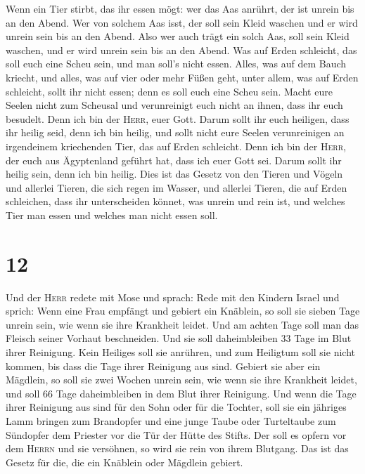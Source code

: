  Wenn ein Tier stirbt, das ihr essen mögt: wer das Aas
anrührt, der ist unrein bis an den Abend.  Wer von
solchem Aas isst, der soll sein Kleid waschen und er wird unrein sein
bis an den Abend. Also wer auch trägt ein solch Aas, soll sein Kleid
waschen, und er wird unrein sein bis an den Abend.  Was
auf Erden schleicht, das soll euch eine Scheu sein, und man soll's nicht
essen.  Alles, was auf dem Bauch kriecht, und alles, was
auf vier oder mehr Füßen geht, unter allem, was auf Erden schleicht,
sollt ihr nicht essen; denn es soll euch eine Scheu sein.
 Macht eure Seelen nicht zum Scheusal und verunreinigt
euch nicht an ihnen, dass ihr euch besudelt.  Denn ich
bin der \textsc{Herr}, euer Gott. Darum sollt ihr euch heiligen, dass
ihr heilig seid, denn ich bin heilig, und sollt nicht eure Seelen
verunreinigen an irgendeinem kriechenden Tier, das auf Erden schleicht.
 Denn ich bin der \textsc{Herr}, der euch aus Ägyptenland
geführt hat, dass ich euer Gott sei. Darum sollt ihr heilig sein, denn
ich bin heilig.  Dies ist das Gesetz von den Tieren und
Vögeln und allerlei Tieren, die sich regen im Wasser, und allerlei
Tieren, die auf Erden schleichen,  dass ihr unterscheiden
könnet, was unrein und rein ist, und welches Tier man essen und welches
man nicht essen soll.

\hypertarget{section-11}{%
\section{12}\label{section-11}}

 Und der \textsc{Herr} redete mit Mose und sprach:
 Rede mit den Kindern Israel und sprich: Wenn eine Frau
empfängt und gebiert ein Knäblein, so soll sie sieben Tage unrein sein,
wie wenn sie ihre Krankheit leidet.  Und am achten Tage
soll man das Fleisch seiner Vorhaut beschneiden.  Und sie
soll daheimbleiben 33 Tage im Blut ihrer Reinigung. Kein Heiliges soll
sie anrühren, und zum Heiligtum soll sie nicht kommen, bis dass die Tage
ihrer Reinigung aus sind.  Gebiert sie aber ein Mägdlein,
so soll sie zwei Wochen unrein sein, wie wenn sie ihre Krankheit leidet,
und soll 66 Tage daheimbleiben in dem Blut ihrer Reinigung.
 Und wenn die Tage ihrer Reinigung aus sind für den Sohn
oder für die Tochter, soll sie ein jähriges Lamm bringen zum Brandopfer
und eine junge Taube oder Turteltaube zum Sündopfer dem Priester vor die
Tür der Hütte des Stifts.  Der soll es opfern vor dem
\textsc{Herrn} und sie versöhnen, so wird sie rein von ihrem Blutgang.
Das ist das Gesetz für die, die ein Knäblein oder Mägdlein gebiert.

